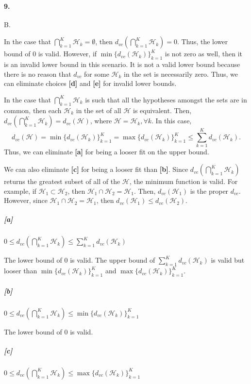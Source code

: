 \documentclass[10pt,letter]{article}
\begin{document}
\paragraph{9.} B.

	In the case that $\bigcap_{k=1}^K \mathcal H_k = \emptyset$, then $d_{vc}(\bigcap_{k=1}^K \mathcal H_k) = 0$. Thus, the lower bound of 0 is valid. However, if $\min\{d_{vc}(\mathcal H_k)\}_{k=1}^K$ is not zero as well, then it is an invalid lower bound in this scenario. It is not a valid lower bound because there is no reason that $d_{vc}$ for some $\mathcal H_k$ in the set is necessarily zero. Thus, we can eliminate choices \textbf{[d]} and \textbf{[e]} for invalid lower bounds.

	In the case that $\bigcap_{k=1}^K \mathcal H_k$ is such that all the hypotheses amongst the sets are in common, then each $\mathcal H_k$ in the set of all $\mathcal H$ is equivalent. Then, $d_{vc}(\bigcap_{k=1}^K \mathcal H_k) = d_{vc} (\mathcal H)$, where $\mathcal H = \mathcal H_k, \forall k$. In this case, $$d_{vc} (\mathcal H) = \min\{d_{vc}(\mathcal H_k)\}_{k=1}^K = \max\{d_{vc}(\mathcal H_k)\}_{k=1}^K \leq \sum_{k=1}^K d_{vc}(\mathcal H_k).$$Thus, we can eliminate \textbf{[a]} for being a looser fit on the upper bound. 

	We can also eliminate \textbf{[c]} for being a looser fit than \textbf{[b]}. Since $d_{vc}(\bigcap_{k=1}^K \mathcal H_k)$ returns the greatest subset of all of the $\mathcal H$, the minimum function is valid. For example, if $\mathcal H_1 \subset \mathcal H_2$, then $\mathcal H_1 \cap \mathcal H_2 = \mathcal H_1$. Then, $d_{vc}(\mathcal H_1)$ is the proper $d_{vc}$. However, since $\mathcal H_1 \cap \mathcal H_2 = \mathcal H_1$, then $d_{vc}(\mathcal H_1) \leq d_{vc}(\mathcal H_2)$.

	\subparagraph{[a]} 
		$0 \leq d_{vc}(\bigcap_{k=1}^K \mathcal H_k) \leq \sum_{k=1}^K d_{vc}(\mathcal H_k)$
		
		The lower bound of 0 is valid. The upper bound of $\sum_{k=1}^K d_{vc}(\mathcal H_k)$ is valid but looser than $\min\{d_{vc}(\mathcal H_k)\}_{k=1}^K$ and $\max\{d_{vc}(\mathcal H_k)\}_{k=1}^K$.
	
	\subparagraph{[b]} 
		$0 \leq d_{vc}(\bigcap_{k=1}^K \mathcal H_k) \leq \min\{d_{vc}(\mathcal H_k)\}_{k=1}^K$
		
		The lower bound of 0 is valid. 
	
	\subparagraph{[c]} 
		$0 \leq d_{vc}(\bigcap_{k=1}^K \mathcal H_k) \leq \max\{d_{vc}(\mathcal H_k)\}_{k=1}^K$
		
\end{document}
